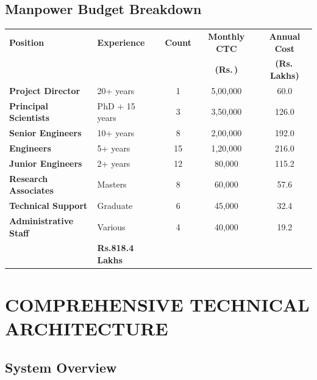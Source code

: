 \documentclass[12pt,a4paper]{article}
\newcommand{\rupees}{Rs.\,}
\begin{document}
\subsection{Manpower Budget Breakdown}

\begin{longtable}{|p{4cm}|p{3cm}|c|c|c|}
\hline
\rowcolor{lightblue}
\textbf{Position} & \textbf{Experience} & \textbf{Count} & \textbf{Monthly CTC} & \textbf{Annual Cost} \\
& & & \textbf{(\rupees)} & \textbf{(\rupees Lakhs)} \\
\hline
\endhead

\textbf{Project Director} & 20+ years & 1 & 5,00,000 & 60.0 \\
\hline

\textbf{Principal Scientists} & PhD + 15 years & 3 & 3,50,000 & 126.0 \\
\hline

\textbf{Senior Engineers} & 10+ years & 8 & 2,00,000 & 192.0 \\
\hline

\textbf{Engineers} & 5+ years & 15 & 1,20,000 & 216.0 \\
\hline

\textbf{Junior Engineers} & 2+ years & 12 & 80,000 & 115.2 \\
\hline

\textbf{Research Associates} & Masters & 8 & 60,000 & 57.6 \\
\hline

\textbf{Technical Support} & Graduate & 6 & 45,000 & 32.4 \\
\hline

\textbf{Administrative Staff} & Various & 4 & 40,000 & 19.2 \\
\hline

\rowcolor{yellow}
\multicolumn{4}{|c|}{\textbf{TOTAL MANPOWER (3 YEARS)}} & \textbf{Rs.818.4 Lakhs} \\
\hline

\end{longtable}

\newpage

\section{COMPREHENSIVE TECHNICAL ARCHITECTURE}

\subsection{System Overview}
\end{document}
